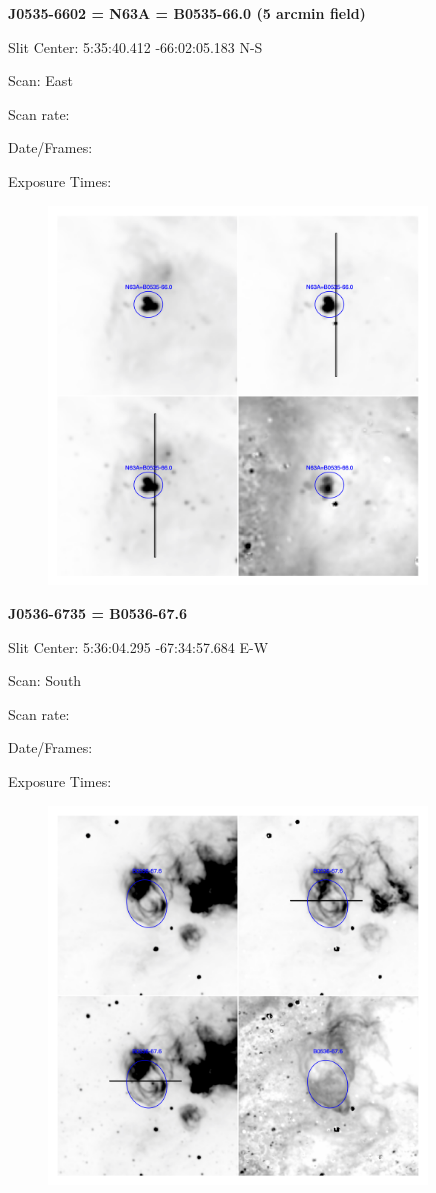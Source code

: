 \documentclass[11pt]{article}
\begin{document}
\newpage
{\bf J0535-6602 = N63A = B0535-66.0   (5  arcmin field)}  
 
Slit Center:   5:35:40.412   -66:02:05.183   N-S

Scan:  East

Scan rate:  

Date/Frames:

Exposure Times:  

\begin{figure}
\includegraphics[width=10.05cm]{snapshots/N63A_5arcmin.png}
\end{figure}

\newpage
{\bf J0536-6735 = B0536-67.6}  
 
Slit Center:   5:36:04.295  -67:34:57.684  E-W

Scan:  South

Scan rate:  

Date/Frames:

Exposure Times:  

\begin{figure}
\includegraphics[width=10.05cm]{snapshots/B0536-676.png}
\end{figure}
\end{document}

